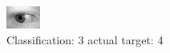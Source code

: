 \begin{figure}[h!]
\begin{center}
\includegraphics[width=0.60\columnwidth]{figures/ID736_class_3_target_4.png}
\end{center}
\caption{ Classification: 3 actual target: 4}
\label{fig:ID736_class_3_target_4}
\end{figure}
